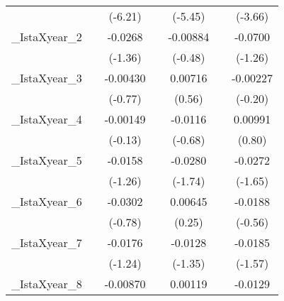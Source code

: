 {\begin{tabular}{l*{6}{c}}
            &                     &     (-6.21)         &                     &     (-5.45)         &                     &     (-3.66)         \\
[1em]
\_IstaXyear\_2&                     &     -0.0268         &                     &    -0.00884         &                     &     -0.0700         \\
            &                     &     (-1.36)         &                     &     (-0.48)         &                     &     (-1.26)         \\
[1em]
\_IstaXyear\_3&                     &    -0.00430         &                     &     0.00716         &                     &    -0.00227         \\
            &                     &     (-0.77)         &                     &      (0.56)         &                     &     (-0.20)         \\
[1em]
\_IstaXyear\_4&                     &    -0.00149         &                     &     -0.0116         &                     &     0.00991         \\
            &                     &     (-0.13)         &                     &     (-0.68)         &                     &      (0.80)         \\
[1em]
\_IstaXyear\_5&                     &     -0.0158         &                     &     -0.0280         &                     &     -0.0272         \\
            &                     &     (-1.26)         &                     &     (-1.74)         &                     &     (-1.65)         \\
[1em]
\_IstaXyear\_6&                     &     -0.0302         &                     &     0.00645         &                     &     -0.0188         \\
            &                     &     (-0.78)         &                     &      (0.25)         &                     &     (-0.56)         \\
[1em]
\_IstaXyear\_7&                     &     -0.0176         &                     &     -0.0128         &                     &     -0.0185         \\
            &                     &     (-1.24)         &                     &     (-1.35)         &                     &     (-1.57)         \\
[1em]
\_IstaXyear\_8&                     &    -0.00870         &                     &     0.00119         &                     &     -0.0129         \\

\end{tabular}}
